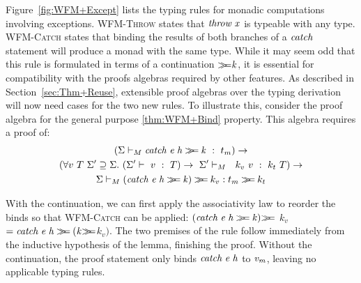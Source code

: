 Figure~\ref{fig:WFM+Except} lists the typing rules for monadic
computations involving exceptions. \textsc{WFM-Throw} states that
\ensuremath{\Varid{throw}\;\Varid{x}} is typeable with any type. \textsc{WFM-Catch} states that
binding the results of both branches of a \ensuremath{\Varid{catch}} statement will
produce a monad with the same type. While it may seem odd that this
rule is formulated in terms of a continuation \ensuremath{\bind \Varid{k}}, it is essential
for compatibility with the proofs algebras required by other
features. As described in Section~\ref{sec:Thm+Reuse}, extensible
proof algebras over the typing derivation will now need cases for the
two new rules. To illustrate this, consider the proof algebra for the
general purpose \ref{thm:WFM+Bind} property. This algebra requires a
proof of:
\begin{multline*}
 (\Sigma\vdash_M\ensuremath{\Varid{catch}\;\Varid{e}\;\Varid{h}\bind \Varid{k}} ~:~t_m) \rightarrow \\
   (\forall v~T~\Sigma'\supseteq\Sigma.~(\Sigma'\vdash~v~:~T) \rightarrow
   ~\Sigma'\vdash_M~~ k_v~v~:~ k_t~T) \rightarrow \\
   \Sigma\vdash_M(\ensuremath{\Varid{catch}\;\Varid{e}\;\Varid{h}\bind \Varid{k}}) \ensuremath{\bind } k_v:t_m \ensuremath{\bind } k_t
\end{multline*}


With the continuation, we can first apply the associativity law to
reorder the binds so that \textsc{WFM-Catch} can be applied: \ensuremath{(\Varid{catch}\;\Varid{e}\;\Varid{h}\bind \Varid{k})\bind } $k_v$ \ensuremath{\mathrel{=}\Varid{catch}\;\Varid{e}\;\Varid{h}\bind (\Varid{k}\bind }$k_v)$. The two premises
of the rule follow immediately from the inductive hypothesis of the
lemma, finishing the proof. Without the continuation, the proof
statement only binds \ensuremath{\Varid{catch}\;\Varid{e}\;\Varid{h}} to \ensuremath{\Varid{v}_\Varid{m}}, leaving no applicable
typing rules.



